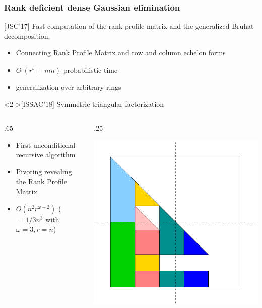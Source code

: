 \documentclass{beamer}
\begin{document}
\begin{frame}
  \frametitle{Rank deficient dense Gaussian elimination}
  \begin{block}
    {[JSC'17] Fast computation of the rank profile matrix and the generalized
      Bruhat decomposition.}
{    \small
  \begin{itemize}
    \item Connecting Rank Profile Matrix and row and column echelon forms
    \item $O\tilde\ (r^\omega + mn)$ probabilistic time
    \item generalization over arbitrary rings
    \end{itemize}
}
  \end{block}

  \begin{block}<2->{[ISSAC'18] Symmetric triangular factorization}
    \begin{columns}
      \begin{column} {.65\textwidth}
        \begin{itemize}
        \item First unconditional recursive algorithm
        \item Pivoting revealing the Rank Profile Matrix
        \item $O(n^2r^{\omega-2}) $ ($=1/3n^3$ with $\omega=3, r=n$)
        \end{itemize}
      \end{column}
      \begin{column} {.25\textwidth}
        \begin{center}
          \includegraphics[width=\textwidth]{ARrec11}
        \end{center}
      \end{column}
    \end{columns}
  \end{block}
\end{frame}
\end{document}
